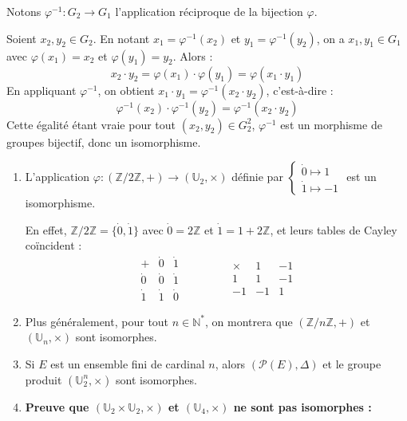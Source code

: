 \documentclass[a4paper,11pt]{article}
\newcommand{\N}{\mathbb{N}}
\newcommand{\Z}{\mathbb{Z}}
\newcommand{\U}{\mathbb{U}}
\begin{document}
\begin{demonstration}
Notons $\varphi^{-1} : G_2 \to G_1$ l'application réciproque de la bijection $\varphi$.

Soient $x_2, y_2 \in G_2$. En notant $x_1 = \varphi^{-1}(x_2)$ et $y_1 = \varphi^{-1}(y_2)$, on a $x_1, y_1 \in G_1$ avec $\varphi(x_1) = x_2$ et $\varphi(y_1) = y_2$. Alors :
\[
x_2 \cdot y_2 = \varphi(x_1) \cdot \varphi(y_1) = \varphi(x_1 \cdot y_1)
\]
En appliquant $\varphi^{-1}$, on obtient $x_1 \cdot y_1 = \varphi^{-1}(x_2 \cdot y_2)$, c'est-à-dire :
\[
\varphi^{-1}(x_2) \cdot \varphi^{-1}(y_2) = \varphi^{-1}(x_2 \cdot y_2)
\]
Cette égalité étant vraie pour tout $(x_2, y_2) \in G_2^2$, $\varphi^{-1}$ est un morphisme de groupes bijectif, donc un isomorphisme.
\end{demonstration}

\begin{exemples}
\begin{enumerate}
  \item L'application $\varphi : (\Z/2\Z, +) \to (\U_2, \times)$ définie par $\begin{cases} \dot{0} \longmapsto 1 \\ \dot{1} \longmapsto -1 \end{cases}$ est un isomorphisme.
  
  En effet, $\Z/2\Z = \{\dot{0}, \dot{1}\}$ avec $\dot{0} = 2\Z$ et $\dot{1} = 1 + 2\Z$, et leurs tables de Cayley coïncident :
  \[
  \begin{array}{c|cc}
  + & \dot{0} & \dot{1} \\
  \hline
  \dot{0} & \dot{0} & \dot{1} \\
  \dot{1} & \dot{1} & \dot{0}
  \end{array}
  \qquad \qquad
  \begin{array}{c|cc}
  \times & 1 & -1 \\
  \hline
  1 & 1 & -1 \\
  -1 & -1 & 1
  \end{array}
  \]
  
  \item Plus généralement, pour tout $n \in \N^*$, on montrera que $(\Z/n\Z, +)$ et $(\U_n, \times)$ sont isomorphes.
  
  \item Si $E$ est un ensemble fini de cardinal $n$, alors $(\mathcal{P}(E), \Delta)$ et le groupe produit $(\U_2^n, \times)$ sont isomorphes.
  
  \item \textbf{Preuve que $(\U_2 \times \U_2, \times)$ et $(\U_4, \times)$ ne sont pas isomorphes :}
  

\end{enumerate}
\end{exemples}
\end{document}

